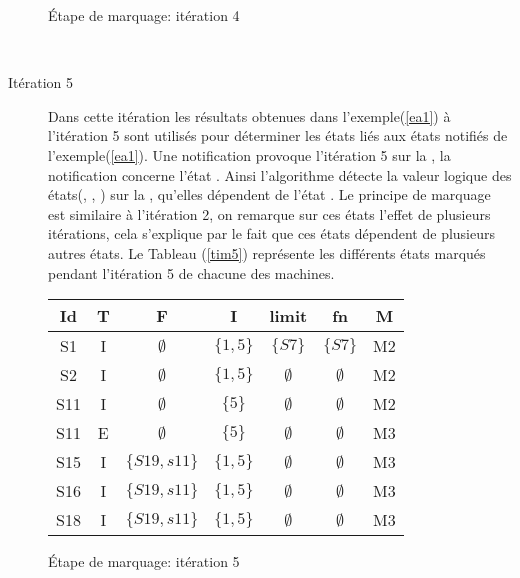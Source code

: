 \begin{Exemple}
\begin{description}
\begin{tableth}
\begin{tabular}{|*{7}{c|}}
	\end{tabular}
	\caption{Étape de marquage: itération 4}\label{tim4}
\end{tableth}\\

	\item[Itération 5] Dans cette itération les résultats obtenues dans l'exemple(\ref{ea1}) à l'itération 5 sont utilisés pour déterminer les états liés aux états notifiés de l'exemple(\ref{ea1}). Une notification provoque l'itération 5 sur la \mtree{}, la notification concerne l'état . Ainsi l'algorithme détecte la valeur logique des états(, , ) sur la \mtree{}, qu'elles dépendent de l'état . Le principe de marquage est similaire à l'itération 2, on remarque sur ces états l'effet de plusieurs itérations, cela s'explique par le fait que ces états dépendent de plusieurs autres états. Le Tableau (\ref{tim5}) représente les différents états marqués pendant l'itération 5 de chacune des machines.
	\begin{tableth}
	\centering
	\begin{tabular}{|*{7}{c|}}
		\hline
		Id&		T&			F&	I&	limit&	fn&		M\\
		\hline
		S1&		I&$\emptyset$&		$\{1 ,5\}$&	$\{S7\}$&	$\{S7\}$&		M2\\ \hline
		S2&		I&$\emptyset$&		$\{1 ,5\}$&$\emptyset$&$\emptyset$&		M2\\ \hline
		S11&	I&$\emptyset$&		$\{5\}$	&$\emptyset$&$\emptyset$&		M2\\ \hline
		S11& 	E&$\emptyset$&		$\{5\}$&$\emptyset$&$\emptyset$&		M3\\ \hline
		S15&	I&	$\{S19,s11\}$&	$\{1 ,5\}$&$\emptyset$&$\emptyset$&		M3\\ \hline
		S16&	I&	$\{S19,s11\}$&	$\{1 ,5\}$&$\emptyset$&$\emptyset$&		M3\\ \hline
		S18&	I&	$\{S19,s11\}$&	$\{1 ,5\}$&$\emptyset$&$\emptyset$&		M3\\ \hline
	\end{tabular}
	\caption{Étape de marquage: itération 5}\label{tim5}
\end{tableth}\\

\end{description}	
\end{Exemple}